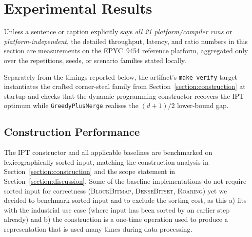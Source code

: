 \documentclass[manuscript,screen,review]{acmart}
\theoremstyle{definition}
\theoremstyle{plain}
\begin{document}
\section{Experimental Results}
\label{section:results}

Unless a sentence or caption explicitly says \emph{all 21
platform/compiler runs} or \emph{platform-independent}, the
detailed throughput, latency, and ratio numbers in this section are
measurements on the EPYC~9454 reference platform, aggregated only over
the repetitions, seeds, or scenario families stated locally.

Separately from the timings reported below, the artifact's
\texttt{make verify} target instantiates the crafted corner-steal
family from Section~\ref{section:construction} at startup and checks
that the dynamic-programming constructor recovers the IPT optimum while
\texttt{GreedyPlusMerge} realises the $(d+1)/2$ lower-bound gap.

\subsection{Construction Performance}
\label{section:results-construct}

The IPT constructor and all applicable baselines are benchmarked on
lexicographically sorted input, matching the construction analysis in
Section~\ref{section:construction} and the scope statement in
Section~\ref{section:discussion}. Some of the baseline implementations
do not require sorted input for correctness (\textsc{BlockBitmap},
\textsc{DenseBitset}, \textsc{Roaring}) yet we decided to benchmark
sorted input and to exclude the sorting cost, as this a) fits with the
industrial use case (where input has been sorted by an earlier step
already) and b) the construction is a one-time operation used to
produce a representation that is used many times during data
processing.
\end{document}
